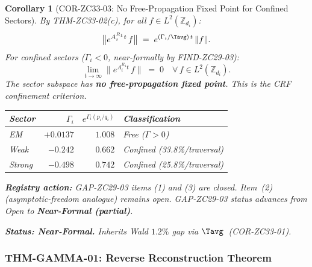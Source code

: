 \documentclass[12pt, a4paper]{article}
\newtheorem{corollary}{Corollary}[section]
\begin{document}
\begin{corollary}[COR-ZC33-03: No Free-Propagation Fixed Point
  for Confined Sectors]
\label{cor:confinement}
By THM-ZC33-02(c), for all $f \in L^2(\mathbb{Z}_{d_i})$:
\[
  \bigl\|e^{A_i^{R_1} t}\, f\bigr\|
  \;=\; e^{(\Gamma_i/\Tavg)\,t}\,\|f\|.
\]
For confined sectors ($\Gamma_i < 0$, near-formally by
FIND-ZC29-03):
\[
  \lim_{t\to\infty} \bigl\|e^{A_i^{R_1} t}\,f\bigr\|
  \;=\; 0
  \quad\forall\, f \in L^2(\mathbb{Z}_{d_i}).
\]
The sector subspace has \textbf{no free-propagation fixed point}.
This is the CRF confinement criterion.

\medskip
\begin{center}
\renewcommand{\arraystretch}{1.3}
\small
\begin{tabular}{lrrl}
\toprule
Sector & $\Gamma_i$ & $e^{\Gamma_i(p_i/q_i)}$ & Classification \\
\midrule
EM     & $+0.0137$ & $1.008$ & Free ($\Gamma > 0$) \\
Weak   & $-0.242$  & $0.662$ & Confined (33.8\%/traversal) \\
Strong & $-0.498$  & $0.742$ & Confined (25.8\%/traversal) \\
\bottomrule
\end{tabular}
\end{center}

\medskip\noindent\textbf{Registry action:}
GAP-ZC29-03 items (1) and (3) are closed.
Item~(2) (asymptotic-freedom analogue) remains open.
GAP-ZC29-03 status advances from Open to
\textbf{Near-Formal (partial)}.

\medskip\noindent\textbf{Status: Near-Formal.}
Inherits Wald $1.2\%$ gap via $\Tavg$~(COR-ZC33-01).
\end{corollary}

\subsubsection{THM-GAMMA-01: Reverse Reconstruction Theorem}
\label{sec:thm-gamma}
\end{document}
